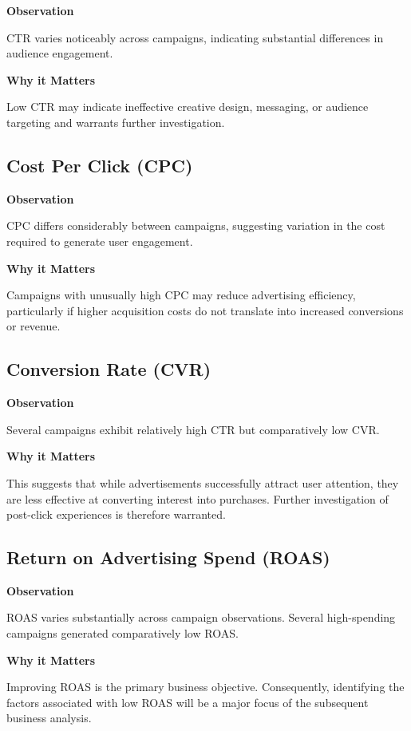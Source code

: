\documentclass[11pt]{article}
\begin{document}
	\textbf{Observation}
	
	CTR varies noticeably across campaigns, indicating substantial differences in audience engagement.
	
	\textbf{Why it Matters}
	
	Low CTR may indicate ineffective creative design, messaging, or audience targeting and warrants further investigation.
	
	\subsection*{Cost Per Click (CPC)}
	
	\textbf{Observation}
	
	CPC differs considerably between campaigns, suggesting variation in the cost required to generate user engagement.
	
	\textbf{Why it Matters}
	
	Campaigns with unusually high CPC may reduce advertising efficiency, particularly if higher acquisition costs do not translate into increased conversions or revenue.
	
	\subsection*{Conversion Rate (CVR)}
	
	\textbf{Observation}
	
	Several campaigns exhibit relatively high CTR but comparatively low CVR.
	
	\textbf{Why it Matters}
	
	This suggests that while advertisements successfully attract user attention, they are less effective at converting interest into purchases. Further investigation of post-click experiences is therefore warranted.
	
	\subsection*{Return on Advertising Spend (ROAS)}
	
	\textbf{Observation}
	
	ROAS varies substantially across campaign observations. Several high-spending campaigns generated comparatively low ROAS.
	
	\textbf{Why it Matters}
	
	Improving ROAS is the primary business objective. Consequently, identifying the factors associated with low ROAS will be a major focus of the subsequent business analysis.
	
\end{document}
